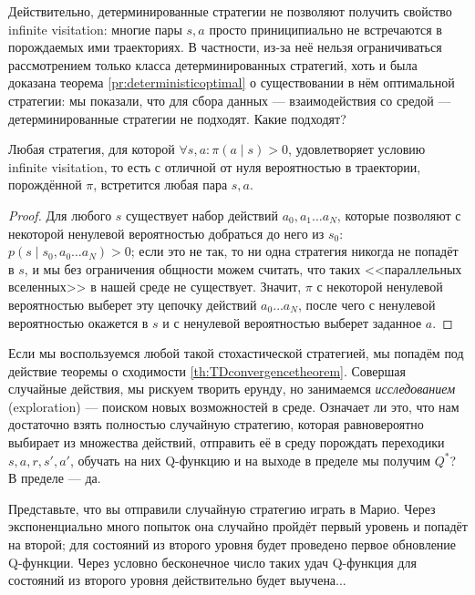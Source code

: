 Действительно, детерминированные стратегии не позволяют получить свойство infinite visitation: многие пары $s, a$ просто приниципиально не встречаются в порождаемых ими траекториях. В частности, из-за неё нельзя ограничиваться рассмотрением только класса детерминированных стратегий, хоть и была доказана теорема \ref{pr:deterministicoptimal} о существовании в нём оптимальной стратегии: мы показали, что для сбора данных --- взаимодействия со средой --- детерминированные стратегии не подходят. Какие подходят?

\begin{theorem}
Любая стратегия, для которой $\forall s, a \colon \pi(a \mid s) > 0$, удовлетворяет условию infinite visitation, то есть с отличной от нуля вероятностью в траектории, порождённой $\pi$, встретится любая пара $s, a$.
\begin{proof}
Для любого $s$ существует набор действий $a_0, a_1 \dots a_N$, которые позволяют с некоторой ненулевой вероятностью добраться до него из $s_0$: $p(s \mid s_0, a_0 \dots a_N) > 0$; если это не так, то ни одна стратегия никогда не попадёт в $s$, и мы без ограничения общности можем считать, что таких <<параллельных вселенных>> в нашей среде не существует. Значит, $\pi$ с некоторой ненулевой вероятностью выберет эту цепочку действий $a_0 \dots a_N$, после чего с ненулевой вероятностью окажется в $s$ и с ненулевой вероятностью выберет заданное $a$.
\end{proof}
\end{theorem}

Если мы воспользуемся любой такой стохастической стратегией, мы попадём под действие теоремы о сходимости \ref{th:TDconvergencetheorem}. Совершая случайные действия, мы рискуем творить ерунду, но занимаемся \emph{исследованием} (exploration) --- поиском новых возможностей в среде. Означает ли это, что нам достаточно взять полностью случайную стратегию, которая равновероятно выбирает из множества действий, отправить её в среду порождать переходики $s, a, r, s', a'$, обучать на них Q-функцию и на выходе в пределе мы получим $Q^*$? В пределе --- да.

\begin{example}
Представьте, что вы отправили случайную стратегию играть в Марио. Через экспоненциально много попыток она случайно пройдёт первый уровень и попадёт на второй; для состояний из второго уровня будет проведено первое обновление Q-функции. Через условно бесконечное число таких удач Q-функция для состояний из второго уровня действительно будет выучена...
\end{example}

